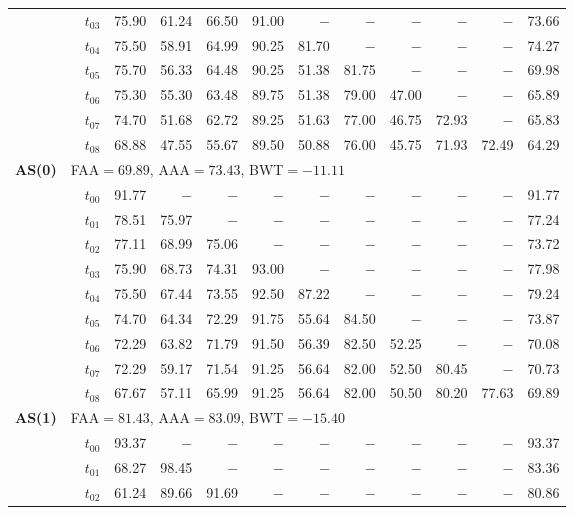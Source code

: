 \begin{table}[ht]
\begin{tabular}{@{}l l l *{10}{r}@{}}
 & & $t_{03}$ & 75.90 & 61.24 & 66.50 & 91.00 & $-$ & $-$ & $-$ & $-$ & $-$ & 73.66 \\
 & & $t_{04}$ & 75.50 & 58.91 & 64.99 & 90.25 & 81.70 & $-$ & $-$ & $-$ & $-$ & 74.27 \\
 & & $t_{05}$ & 75.70 & 56.33 & 64.48 & 90.25 & 51.38 & 81.75 & $-$ & $-$ & $-$ & 69.98 \\
 & & $t_{06}$ & 75.30 & 55.30 & 63.48 & 89.75 & 51.38 & 79.00 & 47.00 & $-$ & $-$ & 65.89 \\
 & & $t_{07}$ & 74.70 & 51.68 & 62.72 & 89.25 & 51.63 & 77.00 & 46.75 & 72.93 & $-$ & 65.83 \\
 & & $t_{08}$ & 68.88 & 47.55 & 55.67 & 89.50 & 50.88 & 76.00 & 45.75 & 71.93 & 72.49 & 64.29 \\
\midrule
\multirow{10}{*}{\textbf{AS(0)}} & \multicolumn{11}{l}{\quad\small FAA$=69.89$,\; AAA$=73.43$,\; BWT$=-11.11$} \\
 & & $t_{00}$ & 91.77 & $-$ & $-$ & $-$ & $-$ & $-$ & $-$ & $-$ & $-$ & 91.77 \\
 & & $t_{01}$ & 78.51 & 75.97 & $-$ & $-$ & $-$ & $-$ & $-$ & $-$ & $-$ & 77.24 \\
 & & $t_{02}$ & 77.11 & 68.99 & 75.06 & $-$ & $-$ & $-$ & $-$ & $-$ & $-$ & 73.72 \\
 & & $t_{03}$ & 75.90 & 68.73 & 74.31 & 93.00 & $-$ & $-$ & $-$ & $-$ & $-$ & 77.98 \\
 & & $t_{04}$ & 75.50 & 67.44 & 73.55 & 92.50 & 87.22 & $-$ & $-$ & $-$ & $-$ & 79.24 \\
 & & $t_{05}$ & 74.70 & 64.34 & 72.29 & 91.75 & 55.64 & 84.50 & $-$ & $-$ & $-$ & 73.87 \\
 & & $t_{06}$ & 72.29 & 63.82 & 71.79 & 91.50 & 56.39 & 82.50 & 52.25 & $-$ & $-$ & 70.08 \\
 & & $t_{07}$ & 72.29 & 59.17 & 71.54 & 91.25 & 56.64 & 82.00 & 52.50 & 80.45 & $-$ & 70.73 \\
 & & $t_{08}$ & 67.67 & 57.11 & 65.99 & 91.25 & 56.64 & 82.00 & 50.50 & 80.20 & 77.63 & 69.89 \\
\midrule
\multirow{10}{*}{\textbf{AS(1)}} & \multicolumn{11}{l}{\quad\small FAA$=81.43$,\; AAA$=83.09$,\; BWT$=-15.40$} \\
 & & $t_{00}$ & 93.37 & $-$ & $-$ & $-$ & $-$ & $-$ & $-$ & $-$ & $-$ & 93.37 \\
 & & $t_{01}$ & 68.27 & 98.45 & $-$ & $-$ & $-$ & $-$ & $-$ & $-$ & $-$ & 83.36 \\
 & & $t_{02}$ & 61.24 & 89.66 & 91.69 & $-$ & $-$ & $-$ & $-$ & $-$ & $-$ & 80.86 \\

\end{tabular}
\end{table}
